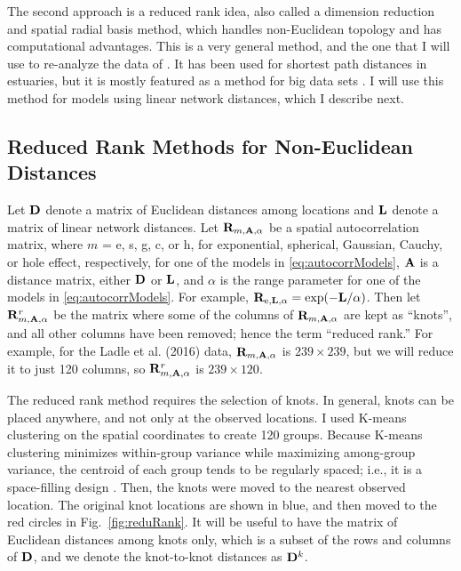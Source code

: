 \documentclass[11pt, titlepage]{article}\usepackage[]{graphicx}\usepackage[]{color}
\begin{document}
\begin{spacing}{1.9}
\begin{flushleft}
The second approach is a reduced rank idea, also called a dimension reduction \citep{Wikl:Cres:dime:1999} and spatial radial basis \citep{Lin:Chen:spat:2004} method, which handles non-Euclidean topology and has computational advantages.  This is a very general method, and the one that I will use to re-analyze the data of \citet{Ladl:Avga:Whea:Boyc:pred:2016}.  It has been used for shortest path distances in estuaries\citep{Wang:Rana:low:2007}, but it is mostly featured as a method for big data sets \citep[e.g.,][]{Wikl:Cres:dime:1999, Rupp:Wand:Carr:semi:2003, Cres:Gard:fixe:2008,Bane:Gelf:Finl:Sang:gaus:2008}.  I will use this method for models using linear network distances, which I describe next.


\subsection*{Reduced Rank Methods for Non-Euclidean Distances}

Let $\mathbf{D}$ denote a matrix of Euclidean distances among locations and $\mathbf{L}$ denote a matrix of linear network distances. Let $\mathbf{R}_{m,\mathbf{A},\alpha}$ be a spatial autocorrelation matrix, where $m$ = e, s, g, c, or h, for exponential, spherical, Gaussian, Cauchy, or hole effect, respectively, for one of the models in \ref{eq:autocorrModels}, $\mathbf{A}$ is a distance matrix, either $\mathbf{D}$ or $\mathbf{L}$, and $\alpha$ is the range parameter for one of the models in \ref{eq:autocorrModels}.  For example, $\mathbf{R}_{\textrm{e},\mathbf{L},\alpha} = \exp(-\mathbf{L}/\alpha)$.  Then let $\mathbf{R}^r_{m,\mathbf{A},\alpha}$ be the matrix where some of the columns of $\mathbf{R}_{m,\mathbf{A},\alpha}$ are kept as ``knots'', and all other columns have been removed; hence the term ``reduced rank.''  For example, for the Ladle et al. (2016) data, $\mathbf{R}_{m,\mathbf{A},\alpha}$ is $239 \times 239$, but we will reduce it to just 120 columns, so $\mathbf{R}^r_{m,\mathbf{A},\alpha}$ is $239 \times 120$.  

The reduced rank method requires the selection of knots.  In general, knots can be placed anywhere, and not only at the observed locations.  I used K-means clustering \citep{MacQ:some:1967} on the spatial coordinates to create 120 groups. Because K-means clustering minimizes within-group variance while maximizing among-group variance, the centroid of each group tends to be regularly spaced; i.e., it is a space-filling design \citep[e.g.,][]{Ver:Jans:esti:2015}.  Then, the knots were moved to the nearest observed location. The original knot locations are shown in blue, and then moved to the red circles in Fig.~\ref{fig:reduRank}.  It will be useful to have the matrix of Euclidean distances among knots only, which is a subset of the rows and columns of $\mathbf{D}$, and we denote the knot-to-knot distances as $\mathbf{D}^k$. 


\end{flushleft}
\end{spacing}
\end{document}
